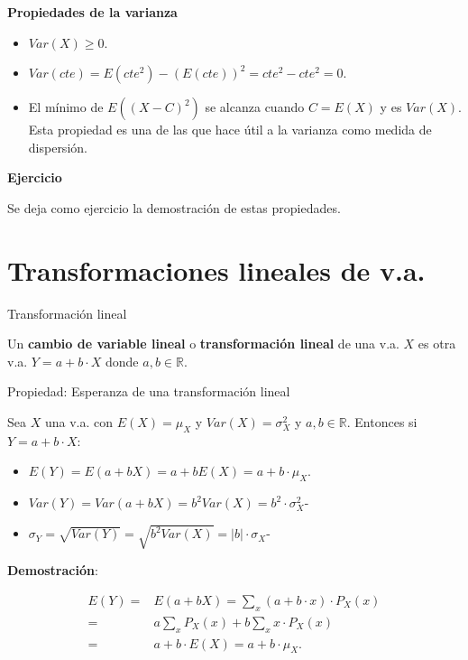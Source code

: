 \documentclass[
  letterpaper,
  DIV=11,
  numbers=noendperiod]{scrreprt}
\providecommand{\tightlist}{%
  \setlength{\itemsep}{0pt}\setlength{\parskip}{0pt}}\usepackage{longtable,booktabs,array}
\begin{document}
\textbf{Propiedades de la varianza}

\begin{itemize}
\tightlist
\item
  \(Var(X)\geq 0\).
\item
  \(Var(cte)=E(cte^2)-(E(cte))^2= cte^2 - cte^2=0\).
\item
  El mínimo de \(E((X-C)^2)\) se alcanza cuando \(C=E(X)\) y es
  \(Var(X)\). Esta propiedad es una de las que hace útil a la varianza
  como medida de dispersión.
\end{itemize}

\textbf{Ejercicio}

Se deja como ejercicio la demostración de estas propiedades.

\section{Transformaciones lineales de
v.a.}\label{transformaciones-lineales-de-v.a.}

\begin{Definicion}{Transformación lineal}{}

Un \textbf{cambio de variable lineal} o \textbf{transformación lineal}
de una v.a. \(X\) es otra v.a. \(Y= a+ b\cdot  X\) donde
\(a,b\in\mathbb{R}\).

\end{Definicion}

Propiedad: Esperanza de una transformación lineal

Sea \(X\) una v.a. con \(E(X)=\mu_{X}\) y \(Var(X)=\sigma_{X}^2\) y
\(a,b\in\mathbb{R}\). Entonces si \(Y=a+b\cdot  X\):

\begin{itemize}
\tightlist
\item
  \(E(Y)=E(a + b X)=a+ b E(X)= a + b \cdot \mu_{X}\).
\item
  \(Var(Y)=Var(a+bX)=b^2 Var(X)= b^2\cdot  \sigma_{X}^2\)-
\item
  \(\sigma_{Y}=\sqrt{Var(Y)}=\sqrt{b^2 Var(X)}=|b| \cdot \sigma_{X}\)-
\end{itemize}

\textbf{Demostración}:

\begin{align*}
E(Y)= &  E(a+bX)=\sum_{x}(a+b\cdot x)\cdot P_{X}(x)\\
= &  a \sum_{x} P_{X}(x) + b \sum_{x} x\cdot P_{X}(x)\\ 
= &  a + b\cdot E(X)=a + b\cdot\mu_{X}.
\end{align*}
\end{document}
